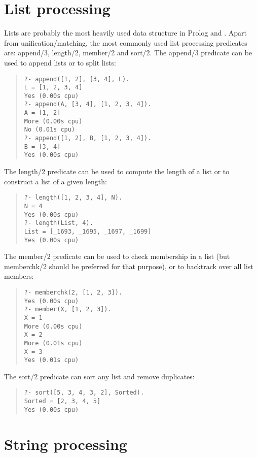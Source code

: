 \newpage
\section{List processing}

Lists are probably the most heavily used data structure in Prolog and
\eclipse{}. Apart from unification/matching, the most commonly used
list processing predicates are: append/3, length/2, member/2 and sort/2.
The append/3 predicate can be used to append lists or to split lists:
\begin{quote}\begin{verbatim}
?- append([1, 2], [3, 4], L).
L = [1, 2, 3, 4]
Yes (0.00s cpu)
?- append(A, [3, 4], [1, 2, 3, 4]).
A = [1, 2]
More (0.00s cpu)
No (0.01s cpu)
?- append([1, 2], B, [1, 2, 3, 4]).
B = [3, 4]
Yes (0.00s cpu)
\end{verbatim}\end{quote}
The length/2 predicate can be used to compute the length of a list
or to construct a list of a given length:
\begin{quote}\begin{verbatim}
?- length([1, 2, 3, 4], N).
N = 4
Yes (0.00s cpu)
?- length(List, 4).
List = [_1693, _1695, _1697, _1699]
Yes (0.00s cpu)
\end{verbatim}\end{quote}
The member/2 predicate can be used to check membership in a list
(but memberchk/2 should be preferred for that purpose),
or to backtrack over all list members:
\begin{quote}\begin{verbatim}
?- memberchk(2, [1, 2, 3]).
Yes (0.00s cpu)
?- member(X, [1, 2, 3]).
X = 1
More (0.00s cpu)
X = 2
More (0.01s cpu)
X = 3
Yes (0.01s cpu)
\end{verbatim}\end{quote}
The sort/2 predicate can sort any list and remove duplicates:
\begin{quote}\begin{verbatim}
?- sort([5, 3, 4, 3, 2], Sorted).
Sorted = [2, 3, 4, 5]
Yes (0.00s cpu)
\end{verbatim}\end{quote}


\section{String processing}

